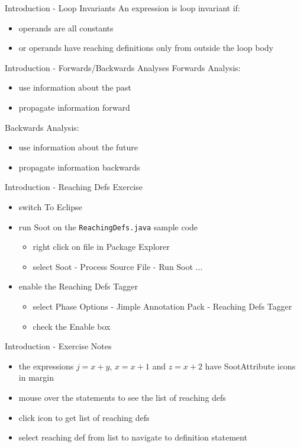 \documentclass[mcgill,slideColor,colorBG,pdf]{prosper}
\begin{document}
\begin{slide} {Introduction - Loop Invariants}
An expression is loop invariant if:
\begin{itemize}
\item operands are all constants
\item or operands have reaching definitions only from outside the loop body
\end{itemize}
\end{slide}

\begin{slide} {Introduction - Forwards/Backwards Analyses}
Forwards Analysis:
\begin{itemize}
\item use information about the past
\item propagate information forward
\end{itemize}
Backwards Analysis:
\begin{itemize}
\item use information about the future
\item propagate information backwards
\end{itemize}
\end{slide}

\begin{slide} {Introduction - Reaching Defs Exercise}
\begin{itemize}
\item switch To Eclipse
\item run Soot on the \texttt{ReachingDefs.java} sample code
\begin{itemize}
\item right click on file in Package Explorer
\item select Soot - Process Source File - Run Soot ...
\end{itemize}
\item enable the Reaching Defs Tagger
\begin{itemize}
\item select Phase Options - Jimple Annotation Pack - Reaching Defs Tagger
\item check the Enable box
\end{itemize}
\end{itemize}

\end{slide}

\begin{slide} {Introduction - Exercise Notes}
\begin{itemize}
\item the expressions $j = x + y$, $x = x + 1$ and $z = x + 2$ have SootAttribute icons
in margin
\item mouse over the statements to see the list of reaching defs
\item click icon to get list of reaching defs
\item select reaching def from list to navigate to definition statement
\end{itemize}
\end{slide}
\end{document}
